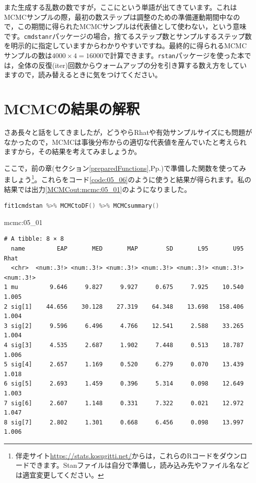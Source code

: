\documentclass{ltjsbook}
\begin{document}
また生成する乱数の数ですが，ここにという単語が出てきています。これはMCMCサンプルの際，最初の数ステップは調整のための準備運動期間中なので，この期間に得られたMCMCサンプルは代表値として使わない，という意味です。\texttt{cmdstanr}パッケージの場合，捨てるステップ数とサンプルするステップ数を明示的に指定していますからわかりやすいですね。最終的に得られるMCMCサンプルの数は$4000\times 4=16000$で計算できます。\texttt{rstan}パッケージを使った本では，全体の反復(iter)回数からウォームアップの分を引き算する数え方をしていますので，読み替えるときに気をつけてください。


\section{MCMCの結果の解釈}
さあ長々と話をしてきましたが，どうやらRhatや有効サンプルサイズにも問題がなかったので，MCMCは事後分布からの適切な代表値を産んでいたと考えられますから，その結果を考えてみましょうか。

ここで，前の章(セクション\ref{preparedFunctions},Pp.\pageref{preparedFunctions})で準備した関数を使ってみましょう\footnote{伴走サイト\url{https://stats.kosugitti.net/}からは，これらのRコードをダウンロードできます。Stanファイルは自分で準備し，読み込み先やファイル名などは適宜変更してください。}。これらをコード\ref{code:05_06}のように使うと結果が得られます。私の結果では出力\ref{MCMCout:mcmc:05_01}のようになりました。

\begin{lstlisting}[language=C++,label={code:05_06},caption={stanの結果を準備し関数に与える}]
fit1cmdstan %>% MCMCtoDF() %>% MCMCsummary()
\end{lstlisting}

\begin{MCMCout}{}{mcmc:05_01}
	\begin{verbatim}
# A tibble: 8 × 8
  name         EAP       MED       MAP        SD       L95       U95      Rhat
  <chr>  <num:.3!> <num:.3!> <num:.3!> <num:.3!> <num:.3!> <num:.3!> <num:.3!>
1 mu         9.646     9.827     9.927     0.675     7.925    10.540     1.005
2 sig[1]    44.656    30.128    27.319    64.348    13.698   158.406     1.004
3 sig[2]     9.596     6.496     4.766    12.541     2.588    33.265     1.004
4 sig[3]     4.535     2.687     1.902     7.448     0.513    18.787     1.006
5 sig[4]     2.657     1.169     0.520     6.279     0.070    13.439     1.018
6 sig[5]     2.693     1.459     0.396     5.314     0.098    12.649     1.003
7 sig[6]     2.607     1.148     0.331     7.322     0.021    12.972     1.047
8 sig[7]     2.802     1.301     0.668     6.456     0.098    13.997     1.006
\end{verbatim}
\end{MCMCout}
\end{document}
